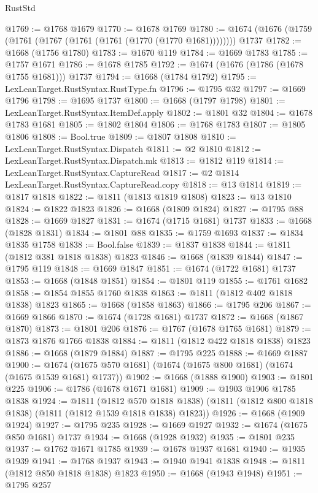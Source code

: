 \begin{lexlean}{RustStd}
\begin{coremodule}
@1769 := @1768 @1679
@1770 := @1678 @1769
@1780 := @1674 (@1676 (@1759 (@1761 (@1767 (@1761 (@1761 (@1770 (@1770 @1681)))))))) @1737
@1782 := @1668 (@1756 @1780)
@1783 := @1670 @119
@1784 := @1669 @1783
@1785 := @1757 @1671
@1786 := @1678 @1785
@1792 := @1674 (@1676 (@1786 (@1678 @1755 @1681))) @1737
@1794 := @1668 (@1784 @1792)
@1795 := LexLeanTarget.RustSyntax.RustType.fn
@1796 := @1795 @32
@1797 := @1669 @1796
@1798 := @1695 @1737
@1800 := @1668 (@1797 @1798)
@1801 := LexLeanTarget.RustSyntax.ItemDef.apply
@1802 := @1801 @32
@1804 := @1678 @1783 @1681
@1805 := @1802 @1804
@1806 := @1768 @1783
@1807 := @1805 @1806
@1808 := Bool.true
@1809 := @1807 @1808
@1810 := LexLeanTarget.RustSyntax.Dispatch
@1811 := @2 @1810
@1812 := LexLeanTarget.RustSyntax.Dispatch.mk
@1813 := @1812 @119
@1814 := LexLeanTarget.RustSyntax.CaptureRead
@1817 := @2 @1814 LexLeanTarget.RustSyntax.CaptureRead.copy
@1818 := @13 @1814
@1819 := @1817 @1818
@1822 := @1811 (@1813 @1819 @1808)
@1823 := @13 @1810
@1824 := @1822 @1823
@1826 := @1668 (@1809 @1824)
@1827 := @1795 @88
@1828 := @1669 @1827
@1831 := @1674 (@1715 @1681) @1737
@1833 := @1668 (@1828 @1831)
@1834 := @1801 @88
@1835 := @1759 @1693
@1837 := @1834 @1835 @1758
@1838 := Bool.false
@1839 := @1837 @1838
@1844 := @1811 (@1812 @381 @1818 @1838) @1823
@1846 := @1668 (@1839 @1844)
@1847 := @1795 @119
@1848 := @1669 @1847
@1851 := @1674 (@1722 @1681) @1737
@1853 := @1668 (@1848 @1851)
@1854 := @1801 @119
@1855 := @1761 @1682
@1858 := @1854 @1855 @1760 @1838
@1863 := @1811 (@1812 @402 @1818 @1838) @1823
@1865 := @1668 (@1858 @1863)
@1866 := @1795 @206
@1867 := @1669 @1866
@1870 := @1674 (@1728 @1681) @1737
@1872 := @1668 (@1867 @1870)
@1873 := @1801 @206
@1876 := @1767 (@1678 @1765 @1681)
@1879 := @1873 @1876 @1766 @1838
@1884 := @1811 (@1812 @422 @1818 @1838) @1823
@1886 := @1668 (@1879 @1884)
@1887 := @1795 @225
@1888 := @1669 @1887
@1900 := @1674 (@1675 @570 @1681) (@1674 (@1675 @800 @1681) (@1674 (@1675 @1539 @1681) @1737))
@1902 := @1668 (@1888 @1900)
@1903 := @1801 @225
@1906 := @1786 (@1678 @1671 @1681)
@1909 := @1903 @1906 @1785 @1838
@1924 := @1811
    (@1812 @570 @1818 @1838)
    (@1811 (@1812 @800 @1818 @1838) (@1811 (@1812 @1539 @1818 @1838) @1823))
@1926 := @1668 (@1909 @1924)
@1927 := @1795 @235
@1928 := @1669 @1927
@1932 := @1674 (@1675 @850 @1681) @1737
@1934 := @1668 (@1928 @1932)
@1935 := @1801 @235
@1937 := @1762 @1671 @1785
@1939 := @1678 @1937 @1681
@1940 := @1935 @1939
@1941 := @1768 @1937
@1943 := @1940 @1941 @1838
@1948 := @1811 (@1812 @850 @1818 @1838) @1823
@1950 := @1668 (@1943 @1948)
@1951 := @1795 @257

\end{coremodule}
\end{lexlean}
